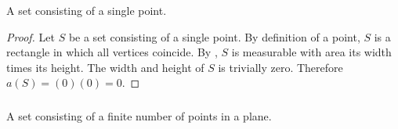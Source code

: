 \documentclass{report}
\begin{document}
  A set consisting of a single point.

  \begin{proof}
    Let $S$ be a set consisting of a single point.
    By definition of a point, $S$ is a rectangle in which all vertices coincide.
    By , $S$ is measurable with area its width
      times its height.
    The width and height of $S$ is trivially zero.
    Therefore $a(S) = (0)(0) = 0$.
  \end{proof}

\subsubsection{}%

  A set consisting of a finite number of points in a plane.
\end{document}
